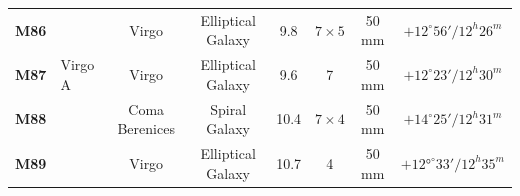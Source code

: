 \documentclass[a4paper,12pt]{extarticle}
\begin{document}
\begin{table}[H]
\begin{tabular}{clcccccc}
\rowcolor[HTML]{F3F3F3} 
\textbf{M86}                             &                                                                                          & Virgo                                         & Elliptical Galaxy             & 9.8                                                                                           & $7\times5$                                                                                              & 50 mm                                                                                       & $+12^\circ 56'/ 12^h 26^m$                                                                   \\
\rowcolor[HTML]{F3F3F3} 
\textbf{M87}                             &  Virgo A                                                                                        & Virgo                                         & Elliptical Galaxy             & 9.6                                                                                           & 7                                                                                               & 50 mm                                                                                       & $+12^\circ 23'/ 12^h 30^m$                                                                   \\
\rowcolor[HTML]{00FFFF} 
\textbf{M88}                             &                                                                                          & Coma Berenices                                & Spiral Galaxy                & 10.4                                                                                          & $7\times4$                                                                                              & 50 mm                                                                                       & $+14^\circ 25'/ 12^h 31^m$                                                                   \\
\rowcolor[HTML]{F3F3F3} 
\textbf{M89}                             &                                                                                          & Virgo                                         & Elliptical Galaxy             & 10.7                                                                                         & 4                                                                                               & 50 mm                                                                                       & $+12°^\circ 33'/ 12^h 35^m$                                                                  \\

\end{tabular}
\end{table}
\end{document}
